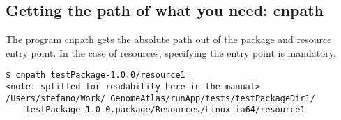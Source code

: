 \subsection{Getting the path of what you need: cnpath}

The program cnpath gets the absolute path out of the package
and resource entry point. In the case of resources, specifying the entry
point is mandatory.

\begin{verbatim}
$ cnpath testPackage-1.0.0/resource1
<note: splitted for readability here in the manual>
/Users/stefano/Work/ GenomeAtlas/runApp/tests/testPackageDir1/
    testPackage-1.0.0.package/Resources/Linux-ia64/resource1
\end{verbatim}

